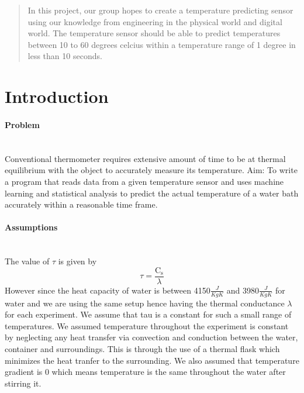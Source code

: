 \documentclass[10pt]{article}
\begin{document}
\maketitle
\newpage
\begin{abstract}
In this project, our group hopes to create a temperature predicting sensor using our knowledge from engineering in the physical world and digital world. The temperature sensor should be able to predict temperatures between 10 to 60 degrees celcius within a temperature range of 1 degree in less than 10 seconds.
\end{abstract}
\section{Introduction}
\paragraph{Problem}\mbox{} \\
Conventional thermometer requires extensive amount of time to be at thermal equilibrium with the object to accurately measure its temperature.
Aim: To write a program that reads data from a given temperature sensor and uses machine learning and statistical analysis to predict the actual temperature of a water bath accurately within a reasonable time frame.
\paragraph{Assumptions}\mbox{} \\
The value of $\tau$ is given by
\begin{equation}
\tau=\frac{\mathrm{C}_{\mathrm{s}}}{\lambda}
\end{equation}
However since the heat capacity of water is between 4150$\frac{J}{KgK}$ and 3980$\frac{J}{KgK}$ for water and we are using the same setup hence having the thermal conductance $\lambda$ for each experiment. We assume that tau is a constant for such a small range of temperatures.
We assumed temperature throughout the experiment is constant by neglecting any heat transfer via convection and conduction between the water, container and surroundings.
This is through the use of a thermal flask which minimizes the heat tranfer to the surrounding.
We also assumed that temperature gradient is 0 which means temperature is  the same throughout the water after stirring it.
\end{document}

